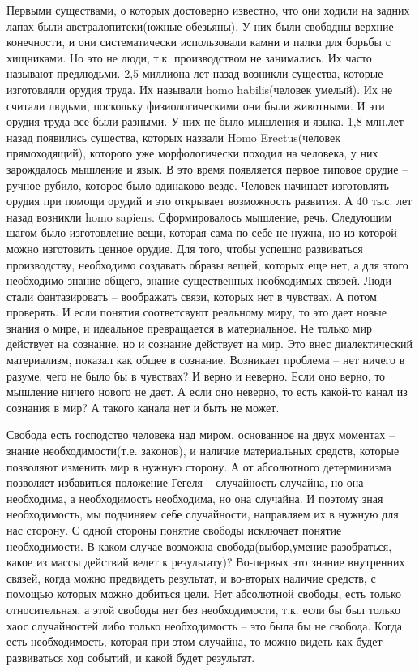 Первыми существами, о которых достоверно известно, что они ходили на задних лапах были австралопитеки(южные обезьяны). У них были свободны верхние конечности, и они систематически использовали камни и палки для борьбы с хищниками. Но это не люди, т.к. производством не занимались. Их часто называют предлюдьми. 2,5 миллиона лет назад возникли существа, которые изготовляли орудия труда. Их называли homo habilis(человек умелый). Их не считали людьми, поскольку физиологическими они были животными. И эти орудия труда все были разными. У них не было мышления и языка. 1,8 млн.лет назад появились существа, которых назвали Homo Erectus(человек прямоходящий), которого уже морфологически походил на человека, у них зарождалось мышление и язык. В это время появляется первое типовое орудие – ручное рубило, которое было одинаково везде. Человек начинает изготовлять орудия при помощи орудий и это открывает возможность развития. А 40 тыс. лет назад возникли homo sapiens. Сформировалось мышление, речь. Следующим шагом было изготовление вещи, которая сама по себе не нужна, но из которой можно изготовить ценное орудие. Для того, чтобы успешно развиваться производству, необходимо создавать образы вещей, которых еще нет, а для этого необходимо знание общего, знание существенных необходимых связей. Люди стали фантазировать – воображать связи, которых нет в чувствах. А потом проверять. И если понятия соответсвуют реальному миру, то это дает новые знания о мире, и идеальное превращается в материальное. Не только мир действует на сознание, но и сознание действует на мир. Это внес диалектический материализм, показал как общее в сознание. Возникает проблема – нет ничего в разуме, чего не было бы в чувствах? И верно и неверно. Если оно верно, то мышление ничего нового не дает. А если оно неверно, то есть какой-то канал из сознания в мир? А такого канала нет и быть не может.

Свобода есть господство человека над миром, основанное на двух моментах – знание необходимости(т.е. законов), и наличие материальных средств, которые позволяют изменить мир в нужную сторону. А от абсолютного детерминизма позволяет избавиться положение Гегеля – случайность случайна, но она необходима, а необходимость необходима, но она случайна. И поэтому зная необходимость, мы подчиняем себе случайности, направляем их в нужную для нас сторону. С одной стороны понятие свободы исключает понятие необходимости. В каком случае возможна свобода(выбор,умение разобраться, какое из массы действий ведет к результату)? Во-первых это знание внутренних связей, когда можно предвидеть результат, и во-вторых наличие средств, с помощью которых можно добиться цели. Нет абсолютной свободы, есть только относительная, а этой свободы нет без необходимости, т.к. если бы был только хаос случайностей либо только необходимость – это была бы не свобода. Когда есть необходимость, которая при этом случайна, то можно видеть как будет развиваться ход событий, и какой будет результат.

